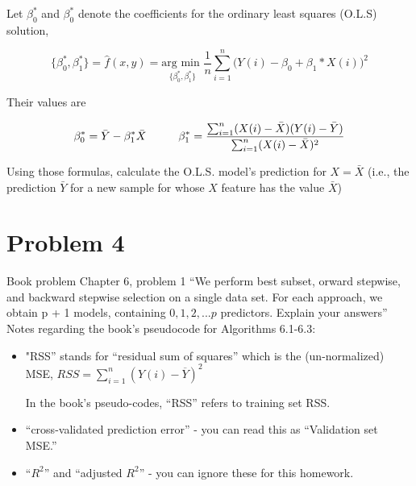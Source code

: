 \documentclass[12pt]{article}
\newcommand\tab[1][1cm]{\hspace*{#1}}
\begin{document}
Let $\beta_{0}^{*}$ and $\beta_{0}^{*}$ denote the coefficients for the ordinary least squares (O.L.S) solution,

\begin{center}
    \[
        \{\beta_{0}^{*}, \beta_{1}^{*}\} = \hat{f}(x,y) = \underset{\{\beta_{0}^{*}, \beta_{1}^{*}\}}{\text{arg min }}\frac{1}{n}\sum_{i = 1}^{n} \bigg( Y(i) - \beta_0 + \beta_1*X(i) \bigg) ^2
    \]
\end{center}

Their values are

\begin{center}
    \[
        \beta_{0}^{*} = \bar{Y} - \beta_{1}^{*}\bar{X}
        \tab
        \beta_{1}^{*} = \frac{\sum_{i = 1}^{n}(X(i) - \bar{X})(Y(i)-\bar{Y})}{\sum_{i = 1}^{n}(X(i)-\bar{X})^2}
    \]
\end{center}

Using those formulas, calculate the O.L.S. model's prediction for $ X = \bar{X}$ (i.e., the prediction $\bar{Y}$ for a new sample for whose $X$ feature has the value $\bar{X}$)

\pagebreak
\section*{Problem 4}
Book problem Chapter 6, problem 1 “We perform best subset, orward stepwise, and backward stepwise selection on a single data set. For each approach, we obtain p + 1 models, containing $0, 1, 2, ... p$ predictors.  Explain your answers” \newline
Notes regarding the book's pseudocode for Algorithms 6.1-6.3:

\begin{itemize}
    \item "RSS” stands for “residual sum of squares” which is the (un-normalized) MSE,\newline
          $RSS = \sum_{i = 1}^{n} ( Y(i) - \overline{Y} )^{2}$

          \medspace

          In the book's pseudo-codes, “RSS” refers to training set RSS.

    \item “cross-validated prediction error” - you can read this as “Validation set MSE.”
    \item “$R^2$” and “adjusted $R^2$” - you can ignore these for this homework.
\end{itemize}

\medspace
\end{document}
